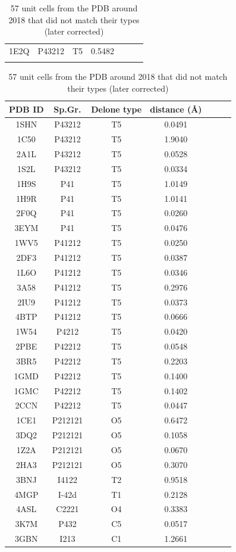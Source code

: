 \documentclass[preprint]{iucr}              %
\begin{document}
\begin{table}
\begin{tabular}{ccccccc}
			1E2Q&P43212&T5&0.5482\\ \\
			\bottomrule
		\end{tabular}
		\begin{tabular}{ccccccc}
			\toprule
			PDB ID & Sp.Gr. & Delone type&distance ({{\AA}}) \\ 
			\midrule
			1SHN&P43212&T5&0.0491\\ 
			1C50&P43212&T5&1.9040\\ 
			2A1L&P43212&T5&0.0528\\ 
			1S2L&P43212&T5&0.0334\\ 
			1H9S&P41&T5&1.0149\\ 
			1H9R&P41&T5&1.0141\\ 
			2F0Q&P41&T5&0.0260\\ 
			3EYM&P41&T5&0.0476\\ 
			1WV5&P41212&T5&0.0250\\ 
			2DF3&P41212&T5&0.0387\\ 
			1L6O&P41212&T5&0.0346\\ 
			3A58&P41212&T5&0.2976\\ 
			2IU9&P41212&T5&0.0373\\ 
			4BTP&P41212&T5&0.0666\\ 
			1W54&P4212&T5&0.0420\\ 
			2PBE&P42212&T5&0.0548\\ 
			3BR5&P42212&T5&0.2203\\ 
			1GMD&P42212&T5&0.1400\\ 
			1GMC&P42212&T5&0.1402\\ 
			2CCN&P42212&T5&0.0447\\ 
			1CE1&P212121&O5&0.6472\\ 
			3DQ2&P212121&O5&0.1058\\ 
			1Z2A&P212121&O5&0.0670\\ 
			2HA3&P212121&O5&0.3070\\ 
			3BNJ&I4122&T2&0.9518\\ 
			4MGP&I-42d&T1&0.2128\\ 
			4ASL&C2221&O4&0.3383\\ 
			3K7M&P432&C5&0.0517\\ 
			3GBN&I213&C1&1.2661\\ 
			\bottomrule
		\end{tabular}
		
		\caption{57 unit cells from the PDB around 2018 that did not match their types (later corrected)}
		\label{tab:PDBCells}
	\end{table}
\end{document}
